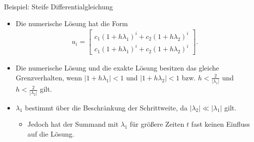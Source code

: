 \begin{frame}{Beispiel: Steife Differentialgleichung}
    \begin{itemize}
        \item<1-> Die numerische Lösung hat die Form
        \begin{align*}
            u_{i}=
            \begin{bmatrix}
                c_1 (1+h\lambda_1)^{i} + c_2 (1+h\lambda_2)^{i}\\
                c_1 (1+h\lambda_1)^{i} + c_2 (1+h\lambda_2)^{i}
            \end{bmatrix}.
        \end{align*}
        \item<2-> Die numerische Lösung und die exakte Lösung besitzen das gleiche Grenzverhalten, wenn
        $|1+h\lambda_1|<1$ und $|1+h\lambda_2|<1$ bzw. $h<\frac{2}{|\lambda_1|}$ und $h<\frac{2}{|\lambda_2|}$ gilt.
        \item<3-> $\lambda_1$ bestimmt über die Beschränkung der Schrittweite, da $|\lambda_2| \ll |\lambda_1|$ gilt.
        \begin{itemize}
            \item<1-> Jedoch hat der Summand mit $\lambda_1$ für größere Zeiten $t$ fast keinen Einfluss auf die Lösung.
        \end{itemize}
    \end{itemize}
\end{frame}
